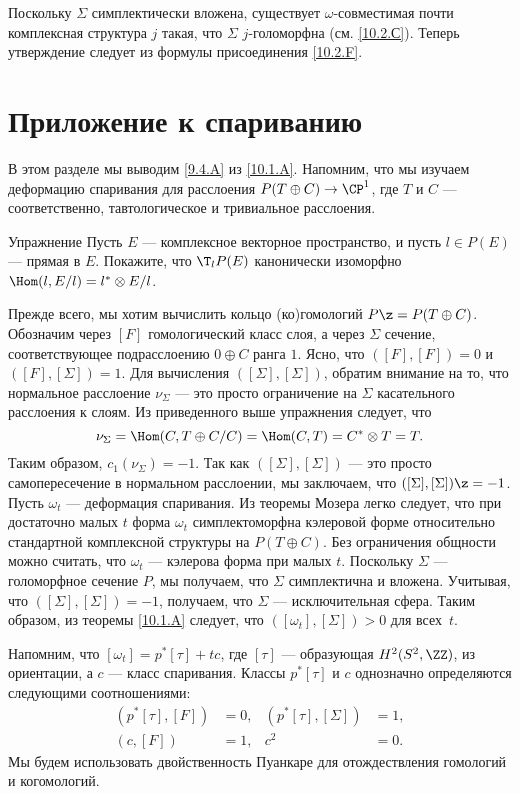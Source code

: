 Поскольку $\Sigma$ симплектически вложена, существует $\omega$-совместимая почти комплексная структура $j$ такая, что $\Sigma$ $j$-голоморфна (см. \ref{10.2.С}).
Теперь утверждение следует из формулы присоединения \ref{10.2.F}.
\qeds


\section{Приложение к спариванию}

В этом разделе мы выводим \ref{9.4.A} из \ref{10.1.A}.
Напомним, что мы изучаем деформацию спаривания для расслоения $P(T \oplus C) \to \CP^1$, где $T$ и $C$ --- соответственно, тавтологическое и тривиальное расслоения.

\begin{ex*}{Упражнение}
Пусть $E$ --- комплексное векторное пространство, и пусть $l \in P(E)$ --- прямая в $E$.
Покажите, что $\T_l P(E)$ канонически изоморфно $\Hom(l, E/l) = l^\ast \otimes E/l$.
\end{ex*}

Прежде всего, мы хотим вычислить кольцо (ко)гомологий $P \z= P(T \oplus C)$.
Обозначим через $[F]$ гомологический класс слоя, а через $\Sigma$ сечение, соответствующее подрасслоению $0\oplus C$ ранга $1$.
Ясно, что $([F], [F]) = 0$ и $([F], [\Sigma]) = 1$.
Для вычисления $([\Sigma], [\Sigma])$, обратим внимание на то, что нормальное расслоение $\nu_\Sigma$ --- это просто ограничение на $\Sigma$ касательного расслоения к слоям.
Из приведенного выше упражнения следует, что 
\[\nu_\Sigma = \Hom(C, T \oplus C/C) = \Hom(C, T) = C^\ast \otimes T = T.\]
Таким образом, $c_1 (\nu_\Sigma) = -1$. 
Так как $([\Sigma], [\Sigma])$ --- это просто самопересечение в нормальном расслоении,
мы заключаем, что $([\Sigma], [\Sigma]) \z= -1$.
Пусть $\omega_t$ --- деформация спаривания.
Из теоремы Мозера \cite{MS} легко следует, что при достаточно малых $t$ форма $\omega_t$ симплектоморфна кэлеровой форме относительно стандартной комплексной структуры на $P(T \oplus C)$.
Без ограничения общности можно считать, что $\omega_t$ --- кэлерова форма при малых $t$.
Поскольку $\Sigma$ --- голоморфное сечение $P$, мы получаем, что $\Sigma$ симплектична и вложена.
Учитывая, что $([\Sigma], [\Sigma]) = -1$, получаем, что $\Sigma$ --- исключительная сфера.
Таким образом, из теоремы \ref{10.1.A} следует, что $([\omega_t], [\Sigma]) > 0$ для всех~$t$.

Напомним, что $[\omega_t] = p^\ast [\tau] + tc$, где $[\tau]$ --- образующая $H^2 (S^2, \ZZ)$,  из ориентации, а $c$ --- класс спаривания.
Классы $p^\ast [\tau]$ и $c$ однозначно определяются следующими соотношениями: 
\begin{align*}
(p^\ast [\tau], [F]) &= 0,
&
(p^\ast [\tau], [\Sigma]) &= 1,
\\
(c, [F]) &= 1,
&
c^2 &= 0.
\end{align*}
Мы будем использовать двойственность Пуанкаре для отождествления гомологий и когомологий.

